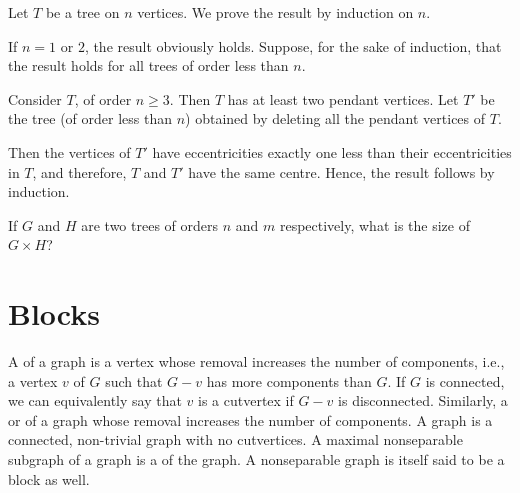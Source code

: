 \begin{Solution*}
Let $T$ be a tree on $n$ vertices. We prove the result by induction on $n$.

If $n = 1$ or $2$, the result obviously holds. Suppose, for the sake of induction, that the result holds for all trees of order less than $n$.

Consider $T$, of order $n \ge 3$. Then $T$ has at least two pendant vertices. Let $T'$ be the tree (of order less than $n$) obtained by deleting all the pendant vertices of $T$.

Then the vertices of $T'$ have eccentricities exactly one less than their eccentricities in $T$, and therefore, $T$ and $T'$ have the same centre. Hence, the result follows by induction.
\end{Solution*}

\begin{Exercise}
If $G$ and $H$ are two trees of orders $n$ and $m$ respectively, what is the size of $G \times H$?
\end{Exercise}

\section{Blocks}\label{sec:Blocks}
A  of a graph is a vertex whose removal increases the number of components, i.e., a vertex $v$ of $G$ such that $G - v$ has more components than $G$. If $G$ is connected, we can equivalently say that $v$ is a cutvertex if $G - v$ is disconnected. Similarly, a  or  of a graph whose removal increases the number of components. A  graph is a connected, non-trivial graph with no cutvertices. A maximal nonseparable subgraph of a graph is a  of the graph. A nonseparable graph is itself said to be a block as well.

